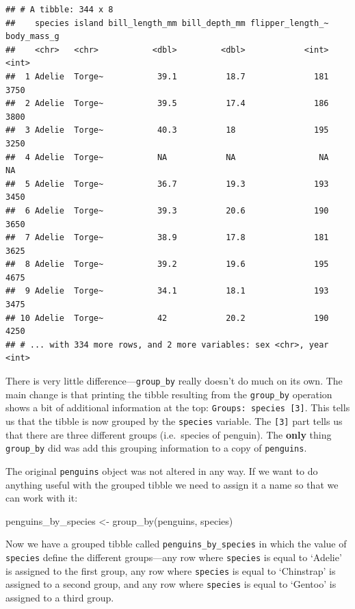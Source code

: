 \documentclass[
]{book}
\newenvironment{Shaded}{\begin{snugshade}}{\end{snugshade}}
\newcommand{\FunctionTok}[1]{\textcolor[rgb]{0.00,0.00,0.00}{#1}}
\newcommand{\NormalTok}[1]{#1}
\newcommand{\OtherTok}[1]{\textcolor[rgb]{0.56,0.35,0.01}{#1}}
\begin{document}
\begin{verbatim}
## # A tibble: 344 x 8
##    species island bill_length_mm bill_depth_mm flipper_length_~ body_mass_g
##    <chr>   <chr>           <dbl>         <dbl>            <int>       <int>
##  1 Adelie  Torge~           39.1          18.7              181        3750
##  2 Adelie  Torge~           39.5          17.4              186        3800
##  3 Adelie  Torge~           40.3          18                195        3250
##  4 Adelie  Torge~           NA            NA                 NA          NA
##  5 Adelie  Torge~           36.7          19.3              193        3450
##  6 Adelie  Torge~           39.3          20.6              190        3650
##  7 Adelie  Torge~           38.9          17.8              181        3625
##  8 Adelie  Torge~           39.2          19.6              195        4675
##  9 Adelie  Torge~           34.1          18.1              193        3475
## 10 Adelie  Torge~           42            20.2              190        4250
## # ... with 334 more rows, and 2 more variables: sex <chr>, year <int>
\end{verbatim}

There is very little difference---\texttt{group\_by} really doesn't do much on its own. The main change is that printing the tibble resulting from the \texttt{group\_by} operation shows a bit of additional information at the top: \texttt{Groups:\ species\ {[}3{]}}. This tells us that the tibble is now grouped by the \texttt{species} variable. The \texttt{{[}3{]}} part tells us that there are three different groups (i.e.~species of penguin). The \textbf{only} thing \texttt{group\_by} did was add this grouping information to a copy of \texttt{penguins}.

The original \texttt{penguins} object was not altered in any way. If we want to do anything useful with the grouped tibble we need to assign it a name so that we can work with it:

\begin{Shaded}
\begin{Highlighting}[]
\NormalTok{penguins\_by\_species }\OtherTok{\textless{}{-}} \FunctionTok{group\_by}\NormalTok{(penguins, species)}
\end{Highlighting}
\end{Shaded}

Now we have a grouped tibble called \texttt{penguins\_by\_species} in which the value of \texttt{species} define the different groups---any row where \texttt{species} is equal to `Adelie' is assigned to the first group, any row where \texttt{species} is equal to `Chinstrap' is assigned to a second group, and any row where \texttt{species} is equal to `Gentoo' is assigned to a third group.
\end{document}
